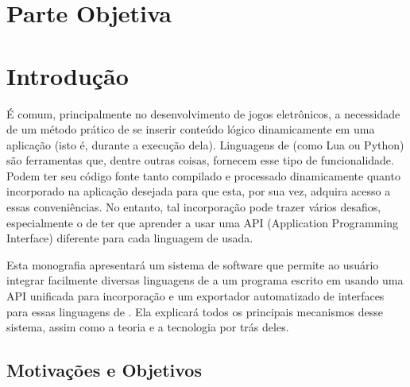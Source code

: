 \chapter*{Parte Objetiva}
\label{sec:parte_objetiva}
\chapter{Introdução}
\label{sec:intr}

É comum, principalmente no desenvolvimento de jogos eletrônicos, a necessidade
de um método prático de se inserir conteúdo lógico dinamicamente em uma
aplicação (isto é, durante a execução dela). Linguagens de \script (como Lua ou
Python) são ferramentas que, dentre outras coisas, fornecem esse tipo de
funcionalidade. Podem ter seu código fonte tanto compilado e processado
dinamicamente quanto incorporado na aplicação desejada para que esta, por sua
vez, adquira acesso a essas conveniências. No entanto, tal incorporação pode
trazer vários desafios, especialmente o de ter que aprender a usar uma API
(Application Programming Interface) diferente para cada linguagem de \script
usada.

Esta monografia apresentará um sistema de software que permite ao usuário
integrar facilmente diversas linguagens de \script a um programa escrito em
\cxx usando uma API unificada para incorporação e um exportador
automatizado de interfaces \cxx para essas linguagens de \script. Ela
explicará todos os principais mecanismos desse sistema, assim como a teoria e a
tecnologia por trás deles.

\section{Motivações e Objetivos}
\label{sec:intr:motivacoes_objetivos}

